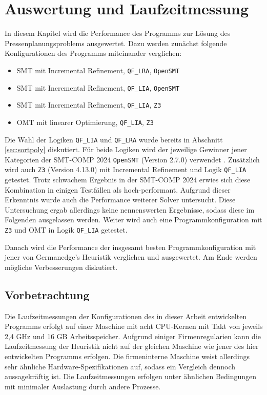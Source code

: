 \chapter{Auswertung und Laufzeitmessung}
\label{chapter:auswertung}
In diesem Kapitel wird die Performance des Programms zur Lösung des Pressenplanungsproblems ausgewertet.
Dazu werden zunächst folgende Konfigurationen des Programms miteinander verglichen:
\begin{itemize}
    \item SMT mit Incremental Refinement, \texttt{QF\_LRA}, \texttt{OpenSMT}
    \item SMT mit Incremental Refinement, \texttt{QF\_LIA}, \texttt{OpenSMT}
    \item SMT mit Incremental Refinement, \texttt{QF\_LIA}, \texttt{Z3}
    \item OMT mit linearer Optimierung, \texttt{QF\_LIA}, \texttt{Z3}
\end{itemize}

Die Wahl der Logiken \texttt{QF\_LIA} und \texttt{QF\_LRA} wurde bereits in Abschnitt \ref{sec:sortpoly} diskutiert.
Für beide Logiken wird der jeweilige Gewinner jener Kategorien der SMT-COMP 2024 \texttt{OpenSMT} (Version 2.7.0) verwendet \cite{smtcomp2024results}.
Zusätzlich wird auch \texttt{Z3} (Version 4.13.0) mit Incremental Refinement und Logik \texttt{QF\_LIA} getestet.
Trotz schwachem Ergebnis in der SMT-COMP 2024 erwies sich diese Kombination in einigen Testfällen als hoch-performant.
Aufgrund dieser Erkenntnis wurde auch die Performance weiterer Solver untersucht.
Diese Untersuchung ergab allerdings keine nennenswerten Ergebnisse, sodass diese im Folgenden ausgelassen werden.
Weiter wird auch eine Programmkonfiguration mit \texttt{Z3} und OMT in Logik \texttt{QF\_LIA} getestet.

Danach wird die Performance der insgesamt besten Programmkonfiguration mit jener von Germanedge's Heuristik verglichen und ausgewertet.
Am Ende werden mögliche Verbesserungen diskutiert.

\section{Vorbetrachtung}
Die Laufzeitmessungen der Konfigurationen des in dieser Arbeit entwickelten Programms erfolgt auf einer Maschine mit
acht CPU-Kernen mit Takt von jeweils 2,4 GHz und 16 GB Arbeitsspeicher.
Aufgrund einiger Firmenregularien kann die Laufzeitmessung der Heuristik nicht auf der gleichen Maschine wie jener des hier entwickelten Programms erfolgen.
Die firmeninterne Maschine weist allerdings sehr ähnliche Hardware-Spezifikationen auf, sodass ein Vergleich dennoch aussagekräftig ist.
Die Laufzeitmessungen erfolgen unter ähnlichen Bedingungen mit minimaler Auslastung durch andere Prozesse.

